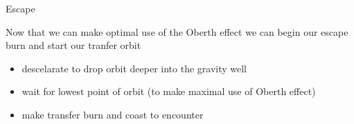 \begin{frame}[t]{Escape}
    \begin{block}{}
        Now that we can make optimal use of the Oberth effect we can begin our escape burn and start our tranfer orbit
    \end{block}
    \begin{block}{}
        \begin{itemize}
            \item descelarate to drop orbit deeper into the gravity well
            \item wait for lowest point of orbit (to make maximal use of Oberth effect)
            \item make transfer burn and coast to encounter
        \end{itemize}
    \end{block}
\end{frame}
